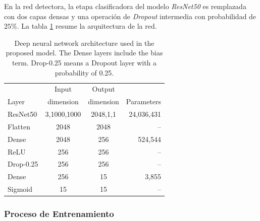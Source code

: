 {En la red detectora, la etapa clasificadora del modelo \textit{ResNet50} es remplazada con dos capas
densas y una operación de \textit{Dropout} intermedia con probabilidad de $25\%$. La tabla
\ref{table_resnet50} resume la arquitectura de la red.

\begin{table}[!ht]
    \centering
    \begin{tabular}{| l|c | c | r |}
    \hline
                 &     Input   &  Output    &  \\
    Layer        &   dimension & dimension  & Parameters \\
    \hline\hline
    ResNet50     &     3,1000,1000 &     2048,1,1 & 24,036,431 \\
    Flatten      &     2048        &     2048     &  --        \\
    Dense        &     2048        &     256      & 524,544    \\
    ReLU         &     256         &     256      & --         \\
    Drop-0.25  &     256         &     256      & --         \\
    Dense        &     256         &     15       &  3,855     \\
    Sigmoid      &     15          &     15       & --         \\
    \hline
    \end{tabular}
    \caption{Deep neural network architecture used in the proposed model. The Dense layers include the bias term. Drop-0.25 means a Dropout layer with a probability of 0.25.}
    \label{table_resnet50}
\end{table}

\subsubsection{Proceso de Entrenamiento}
\label{ss:archiecture}

}
